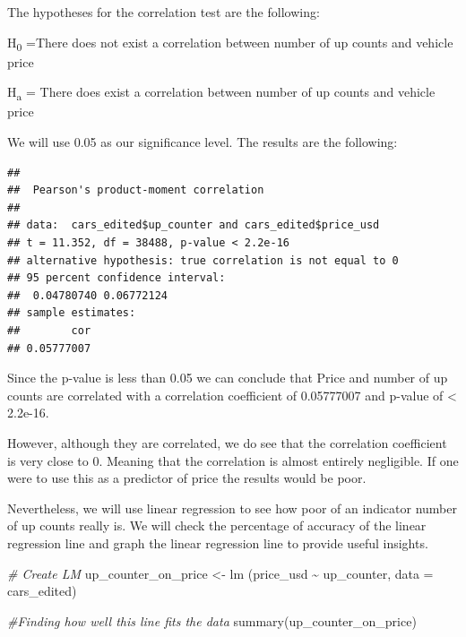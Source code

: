 \documentclass[
]{article}
\newenvironment{Shaded}{\begin{snugshade}}{\end{snugshade}}
\newcommand{\AttributeTok}[1]{\textcolor[rgb]{0.77,0.63,0.00}{#1}}
\newcommand{\CommentTok}[1]{\textcolor[rgb]{0.56,0.35,0.01}{\textit{#1}}}
\newcommand{\FunctionTok}[1]{\textcolor[rgb]{0.00,0.00,0.00}{#1}}
\newcommand{\NormalTok}[1]{#1}
\newcommand{\OtherTok}[1]{\textcolor[rgb]{0.56,0.35,0.01}{#1}}
\newcommand{\SpecialCharTok}[1]{\textcolor[rgb]{0.00,0.00,0.00}{#1}}
\begin{document}
The hypotheses for the correlation test are the following:

H\textsubscript{0} =There does not exist a correlation between number of
up counts and vehicle price

H\textsubscript{a} = There does exist a correlation between number of up
counts and vehicle price

We will use 0.05 as our significance level. The results are the
following:

\begin{Shaded}
\end{Shaded}

\begin{verbatim}
## 
##  Pearson's product-moment correlation
## 
## data:  cars_edited$up_counter and cars_edited$price_usd
## t = 11.352, df = 38488, p-value < 2.2e-16
## alternative hypothesis: true correlation is not equal to 0
## 95 percent confidence interval:
##  0.04780740 0.06772124
## sample estimates:
##        cor 
## 0.05777007
\end{verbatim}

Since the p-value is less than 0.05 we can conclude that Price and
number of up counts are correlated with a correlation coefficient of
0.05777007 and p-value of \textless{} 2.2e-16.

However, although they are correlated, we do see that the correlation
coefficient is very close to 0. Meaning that the correlation is almost
entirely negligible. If one were to use this as a predictor of price the
results would be poor.

Nevertheless, we will use linear regression to see how poor of an
indicator number of up counts really is. We will check the percentage of
accuracy of the linear regression line and graph the linear regression
line to provide useful insights.

\begin{Shaded}
\begin{Highlighting}[]
\CommentTok{\# Create LM}
\NormalTok{up\_counter\_on\_price }\OtherTok{\textless{}{-}} \FunctionTok{lm}\NormalTok{ (price\_usd }\SpecialCharTok{\textasciitilde{}}\NormalTok{ up\_counter, }\AttributeTok{data =}\NormalTok{ cars\_edited)}

\CommentTok{\#Finding how well this line fits the data}
\FunctionTok{summary}\NormalTok{(up\_counter\_on\_price)}
\end{Highlighting}
\end{Shaded}
\end{document}

